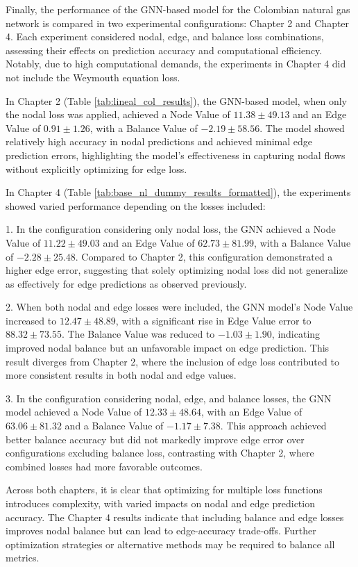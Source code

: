 
Finally, the performance of the GNN-based model for the Colombian natural gas network is compared in two experimental configurations: Chapter 2 and Chapter 4. Each experiment considered nodal, edge, and balance loss combinations, assessing their effects on prediction accuracy and computational efficiency. Notably, due to high computational demands, the experiments in Chapter 4 did not include the Weymouth equation loss.

In Chapter 2 (Table \ref{tab:lineal_col_results}), the GNN-based model, when only the nodal loss was applied, achieved a Node Value of \(11.38 \pm 49.13\) and an Edge Value of \(0.91 \pm 1.26\), with a Balance Value of \(-2.19 \pm 58.56\). The model showed relatively high accuracy in nodal predictions and achieved minimal edge prediction errors, highlighting the model’s effectiveness in capturing nodal flows without explicitly optimizing for edge loss.

In Chapter 4 (Table \ref{tab:base_nl_dummy_results_formatted}), the experiments showed varied performance depending on the losses included:

1. In the configuration considering only nodal loss, the GNN achieved a Node Value of \(11.22 \pm 49.03\) and an Edge Value of \(62.73 \pm 81.99\), with a Balance Value of \(-2.28 \pm 25.48\). Compared to Chapter 2, this configuration demonstrated a higher edge error, suggesting that solely optimizing nodal loss did not generalize as effectively for edge predictions as observed previously.

2. When both nodal and edge losses were included, the GNN model’s Node Value increased to \(12.47 \pm 48.89\), with a significant rise in Edge Value error to \(88.32 \pm 73.55\). The Balance Value was reduced to \(-1.03 \pm 1.90\), indicating improved nodal balance but an unfavorable impact on edge prediction. This result diverges from Chapter 2, where the inclusion of edge loss contributed to more consistent results in both nodal and edge values.

3. In the configuration considering nodal, edge, and balance losses, the GNN model achieved a Node Value of \(12.33 \pm 48.64\), with an Edge Value of \(63.06 \pm 81.32\) and a Balance Value of \(-1.17 \pm 7.38\). This approach achieved better balance accuracy but did not markedly improve edge error over configurations excluding balance loss, contrasting with Chapter 2, where combined losses had more favorable outcomes.

Across both chapters, it is clear that optimizing for multiple loss functions introduces complexity, with varied impacts on nodal and edge prediction accuracy. The Chapter 4 results indicate that including balance and edge losses improves nodal balance but can lead to edge-accuracy trade-offs. Further optimization strategies or alternative methods may be required to balance all metrics.

